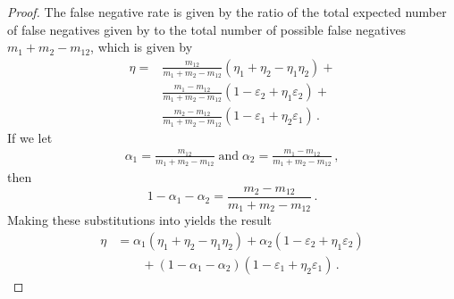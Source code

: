 \documentclass[ ../main.tex]{subfiles}
\begin{document}
\begin{proof}
The false negative rate is given by the ratio of the total expected number of false negatives given by  to the total number of possible false negatives $m_1 + m_2 - m_{1 2}$, which is given by
\begin{equation}
\label{eq:proof_union_fn_4}
\begin{split}
    \eta =
        &\frac{m_{1 2}}{m_1 + m_2 - m_{1 2}} \left(\eta_1 + \eta_2 - \eta_1 \eta_2\right) +\\
        &\frac{m_1 - m_{1 2}}{m_1 + m_2 - m_{1 2}} \left(1 - \varepsilon_2 + \eta_1 \varepsilon_2\right) +\\
        &\frac{m_2 - m_{1 2}}{m_1 + m_2 - m_{1 2}} \left(1 - \varepsilon_1 + \eta_2 \varepsilon_1\right)\,.
\end{split}
\end{equation}
If we let
\begin{align}
    \alpha_1 = \frac{m_{1 2}}{m_1 + m_2 - m_{1 2}}\; \text{and} \;
    \alpha_2 = \frac{m_1 - m_{1 2}}{m_1 + m_2 - m_{1 2}}\,,
\end{align}
then
\begin{equation}
    1 - \alpha_1 - \alpha_2 = \frac{m_2 - m_{1 2}}{m_1 + m_2 - m_{1 2}}\,.
\end{equation}
Making these substitutions into  yields the result
\begin{equation}
\begin{split}
    \eta &=
        \alpha_1 \left(\eta_1 + \eta_2 - \eta_1 \eta_2\right) + \alpha_2 \left(1 - \varepsilon_2 + \eta_1 \varepsilon_2\right)\\
        &\qquad+ (1 - \alpha_1 - \alpha_2) \left(1 - \varepsilon_1 + \eta_2 \varepsilon_1\right)\,.
\end{split}
\end{equation}
\end{proof}
\end{document}
